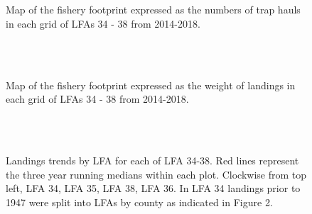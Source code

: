 \documentclass[11pt]{article}
\newcommand{\e}{\string~/bio.data/bio.lobster/figures/LFA3438Framework2019/figures/} %
\begin{document}
\begin{figure}
        \centering
    \\
                \\
        
         \caption{Map of the fishery footprint expressed as the numbers of trap hauls in each grid of LFAs 34 - 38 from 2014-2018.}
        \end{figure}

\begin{figure}
        \centering
    \\
                \\
        
         \caption{Map of the fishery footprint expressed as the weight of landings in each grid of LFAs 34 - 38 from 2014-2018.}
        \end{figure}



\begin{figure}
        \centering
    \\
                \\
                
         \caption{Landings trends by LFA for each of LFA 34-38. Red lines represent the three year running medians within each plot. Clockwise from top left, LFA 34, LFA 35, LFA 38, LFA 36. In LFA 34 landings prior to 1947 were split into LFAs by county as indicated in Figure 2. }
        \end{figure}
\end{document}
